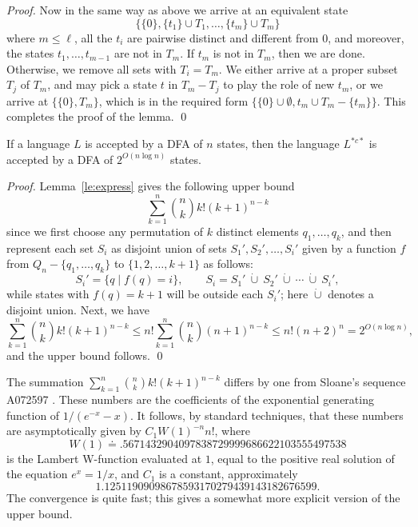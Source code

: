 \documentclass[runningheads]{llncs}
\begin{document}
\begin{proof}
 Now in the same way as above we arrive at an equivalent state 
 $$
  \{ \{0\}, \{t_1\}\cup T_1, \ldots, \{t_m\}\cup T_m \}
 $$
 where $m\le \ell$,
 all the $t_i$ are pairwise distinct and different from $0$,
 and moreover, the states $t_1,\ldots,t_{m-1}$ are not in $T_m$.
 If $t_m$ is not in $T_m$, then we are done.
 Otherwise, we remove all sets with $T_i=T_m$.
 We either arrive at a proper subset $T_j$ of $T_m$,
 and may pick a state $t$ in $T_m-T_j$ to play the role of new $t_m$,
 or we arrive at $\{\{0\}, T_m\}$,
 which is in the required form $\{\{0\}\cup\emptyset, t_m\cup T_m-\{t_m\}\}$.
 This completes the proof of the lemma.
\qed
\end{proof}

\begin{corollary}\label{-----co1}
 If a language $L$ is accepted by a DFA of $n$ states,
 then the language $L^{*c*}$ is accepted by a DFA of $2^{O(n\log n)}$ states.
\end{corollary}

\begin{proof}
 Lemma~\ref{le:express} gives the following upper bound
 $$
    \sum_{k=1}^{n}   {n \choose k} k! (k+1)^{n-k}
 $$
 since 
 we first choose any permutation of $k$ distinct elements $q_1,\ldots,q_k$,
 and then
 represent each set $S_i$ as disjoint union of sets $S_1', S_2',\ldots, S_i'$
 given by a function $f$ from $Q_n-\{q_1,\ldots,q_k\}$ to $\{1,2,\ldots,k+1\}$
 as follows:
 $$
     S_i'=\{q\mid f(q)=i\}, \qquad  
            S_i=S_1'\ \dot\cup \ S_2'\ \dot\cup \ \cdots \ \dot\cup \ S_i',
 $$
 while states with $f(q)=k+1$ will be outside each $S_i'$;
 here $\dot\cup$ denotes a disjoint union.
 Next, we  have
 $$
    \sum_{k=1}^{n}   {n \choose k} k! (k+1)^{n-k}\le
    n! \sum_{k=1}^{n}   {n \choose k}(n+1)^{n-k} \le
   n!(n+2)^n= 2^{O(n\log n)},
 $$
 and the upper bound follows.
\qed
\end{proof}

\begin{remark}
The summation $\sum_{k=1}^n {n \choose k} k! (k+1)^{n-k}$ differs by
one from Sloane's sequence A072597 \cite{Sloane}.  These numbers are the
coefficients of the exponential generating function of
$1/(e^{-x} - x)$.  It follows, by standard techniques, that
these numbers are asymptotically given by
$C_1 W(1)^{-n} n!$,
where
$$W(1) \doteq .5671432904097838729999686622103555497538$$ is the
Lambert W-function evaluated at $1$, equal to the positive real
solution of the equation $e^x = 1/x$, and $C_1$ is a constant,
approximately 
$$1.12511909098678593170279439143182676599.$$
The convergence
is quite fast; this gives a somewhat more explicit version of the
upper bound.
\end{remark}
\end{document}
